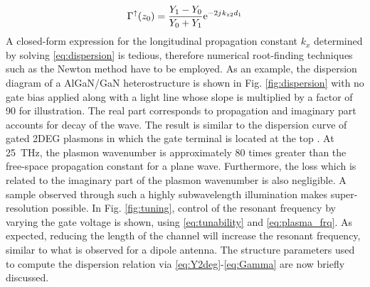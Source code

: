 \documentclass[12pt]{article}
\begin{document}
%
\begin{equation}
  \Gamma^{\uparrow}(z_0) = \frac{Y_1 - Y_0}{Y_0 + Y_1} \mathrm{e}^{-2j\mkern1mu k_{z2}d_1}
  \label{eq:Gamma}
\end{equation}
%
A closed-form expression for the longitudinal propagation constant $k_x$ determined by solving \eqref{eq:dispersion} is tedious, therefore numerical root-finding techniques such as the Newton method \cite{9780521880688} have to be employed. As an example, the dispersion diagram of a AlGaN/GaN heterostructure is shown in Fig. \ref{fig:dispersion} with no gate bias applied along with a light line whose slope is multiplied by a factor of 90 for illustration. The real part corresponds to propagation and imaginary part accounts for decay of the wave. The result is similar to the dispersion curve of gated 2DEG plasmons in which the gate terminal is located at the top \cite{Nakayama1974, Eguiluz1975}. At \SI{25}{\THz}, the plasmon wavenumber is approximately 80 times greater than the free-space propagation constant for a plane wave. Furthermore, the loss which is related to the imaginary part of the plasmon wavenumber is also negligible. A sample observed through such a highly subwavelength illumination makes
super-resolution possible. In Fig. \ref{fig:tuning}, control of the resonant frequency by varying the gate voltage is shown, using \eqref{eq:tunability} and \eqref{eq:plasma_frq}. As expected, reducing the length of the channel will increase the resonant frequency, similar to what is observed for a dipole antenna. The structure parameters used to compute the
dispersion relation via \eqref{eq:Y2deg}-\eqref{eq:Gamma} are now briefly discussed.
\end{document}
